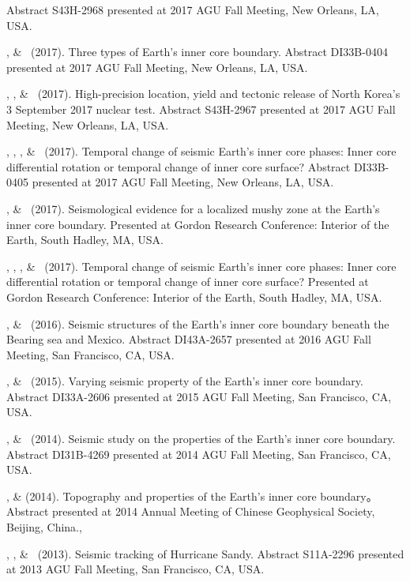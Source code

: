 \begin{etaremune}
    Abstract S43H-2968 presented at 2017 AGU Fall Meeting, New Orleans, LA, USA.
\item
    \Me, \& \LWen\ (2017).
    Three types of Earth's inner core boundary.
    Abstract DI33B-0404 presented at 2017 AGU Fall Meeting, New Orleans, LA, USA.
\item
    \JYao, \Me, \& \LWen\ (2017).
    High-precision location, yield and tectonic release of North Korea's 3 September 2017 nuclear test.
    Abstract S43H-2967 presented at 2017 AGU Fall Meeting, New Orleans, LA, USA.
\item
    \JYao, \Me, \LSun, \& \LWen\ (2017).
    Temporal change of seismic Earth's inner core phases: Inner core differential rotation or temporal change of inner core surface?
    Abstract DI33B-0405 presented at 2017 AGU Fall Meeting, New Orleans, LA, USA.
\item
    \Me, \& \LWen\ (2017).
    Seismological evidence for a localized mushy zone at the Earth's inner core boundary.
    Presented at Gordon Research Conference: Interior of the Earth, South Hadley, MA, USA.
\item
    \JYao, \Me, \LSun, \& \LWen\ (2017).
    Temporal change of seismic Earth's inner core phases: Inner core differential rotation or temporal change of inner core surface?
    Presented at Gordon Research Conference: Interior of the Earth, South Hadley, MA, USA.
\item
    \Me, \& \LWen\ (2016).
    Seismic structures of the Earth's inner core boundary beneath the Bearing sea and Mexico.
    Abstract DI43A-2657 presented at 2016 AGU Fall Meeting, San Francisco, CA, USA.
\item
    \Me, \& \LWen\ (2015).
    Varying seismic property of the Earth's inner core boundary.
    Abstract DI33A-2606 presented at 2015 AGU Fall Meeting, San Francisco, CA, USA.
\item
    \Me, \& \LWen\ (2014).
    Seismic study on the properties of the Earth's inner core boundary.
    Abstract DI31B-4269 presented at 2014 AGU Fall Meeting, San Francisco, CA, USA.
\item
    \Me, \& \LWen (2014).
    Topography and properties of the Earth's inner core boundary。
    Abstract presented at 2014 Annual Meeting of Chinese Geophysical Society, Beijing, China.,
\item
    \XChen, \Me, \& \LWen\ (2013).
    Seismic tracking of Hurricane Sandy.
    Abstract S11A-2296 presented at 2013 AGU Fall Meeting, San Francisco, CA, USA.
\item

\end{etaremune}
